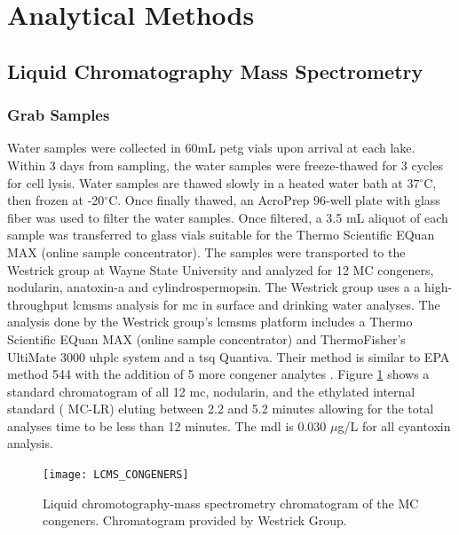 \section{Analytical Methods}

\subsection{Liquid Chromatography Mass Spectrometry} \label{sc:lcms}

\subsubsection{Grab Samples}

Water samples were collected in 60mL \gls{petg} vials upon arrival at each lake. Within 3 days from sampling, the water samples were freeze-thawed for 3 cycles for cell lysis. Water samples are thawed slowly in a heated water bath at 37$^\circ$C, then frozen at -20$^\circ$C. Once finally thawed, an AcroPrep 96-well plate with glass fiber was used to filter the water samples. Once filtered, a 3.5 mL aliquot of each sample was transferred to glass vials suitable for the Thermo Scientific EQuan MAX (online sample concentrator). The samples were transported to the Westrick group at Wayne State University and analyzed for 12 MC congeners, nodularin, anatoxin-a and cylindrospermopsin.  The Westrick group uses a a high-throughput \gls{lcmsms} analysis for \gls{mc} in surface and drinking water analyses.
The analysis done by the Westrick group's \gls{lcmsms} platform includes a Thermo Scientific EQuan MAX (online sample concentrator) and ThermoFisher’s UltiMate 3000 \gls{uhplc} system and a \gls{tsq} Quantiva.
Their method is similar to EPA method 544 with the addition of 5 more congener analytes \cite{shoemaker_method_2015}. Figure \ref{fig:spectra} shows a standard chromatogram of all 12 \gls{mc}, nodularin, and the ethylated internal standard (\ch{[C_2D_5]} MC-LR) eluting between 2.2 and 5.2 minutes allowing for the total analyses time to be less than 12 minutes.  The \gls{mdl} is 0.030  $\mu$g/L  for all cyantoxin analysis. 

\begin{figure}[!h]
\centering
\texttt{[image: LCMS\_CONGENERS]}
\caption{Liquid chromotography-mass spectrometry chromatogram of the MC congeners. Chromatogram provided by Westrick Group.}
\label{fig:spectra}
\end{figure}




